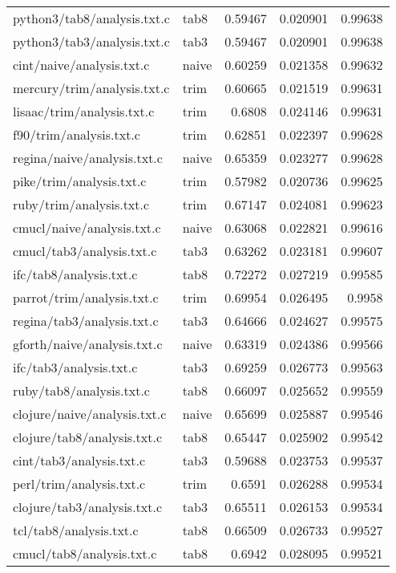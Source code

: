 \begin{longtable}{l l r r r}
{python3/tab8/analysis.txt.c} & tab8 & 0.59467 & 0.020901 & 0.99638 \\
{python3/tab3/analysis.txt.c} & tab3 & 0.59467 & 0.020901 & 0.99638 \\
{cint/naive/analysis.txt.c} & naive & 0.60259 & 0.021358 & 0.99632 \\
{mercury/trim/analysis.txt.c} & trim & 0.60665 & 0.021519 & 0.99631 \\
{lisaac/trim/analysis.txt.c} & trim & 0.6808 & 0.024146 & 0.99631 \\
{f90/trim/analysis.txt.c} & trim & 0.62851 & 0.022397 & 0.99628 \\
{regina/naive/analysis.txt.c} & naive & 0.65359 & 0.023277 & 0.99628 \\
{pike/trim/analysis.txt.c} & trim & 0.57982 & 0.020736 & 0.99625 \\
{ruby/trim/analysis.txt.c} & trim & 0.67147 & 0.024081 & 0.99623 \\
{cmucl/naive/analysis.txt.c} & naive & 0.63068 & 0.022821 & 0.99616 \\
{cmucl/tab3/analysis.txt.c} & tab3 & 0.63262 & 0.023181 & 0.99607 \\
{ifc/tab8/analysis.txt.c} & tab8 & 0.72272 & 0.027219 & 0.99585 \\
{parrot/trim/analysis.txt.c} & trim & 0.69954 & 0.026495 & 0.9958 \\
{regina/tab3/analysis.txt.c} & tab3 & 0.64666 & 0.024627 & 0.99575 \\
{gforth/naive/analysis.txt.c} & naive & 0.63319 & 0.024386 & 0.99566 \\
{ifc/tab3/analysis.txt.c} & tab3 & 0.69259 & 0.026773 & 0.99563 \\
{ruby/tab8/analysis.txt.c} & tab8 & 0.66097 & 0.025652 & 0.99559 \\
{clojure/naive/analysis.txt.c} & naive & 0.65699 & 0.025887 & 0.99546 \\
{clojure/tab8/analysis.txt.c} & tab8 & 0.65447 & 0.025902 & 0.99542 \\
{cint/tab3/analysis.txt.c} & tab3 & 0.59688 & 0.023753 & 0.99537 \\
{perl/trim/analysis.txt.c} & trim & 0.6591 & 0.026288 & 0.99534 \\
{clojure/tab3/analysis.txt.c} & tab3 & 0.65511 & 0.026153 & 0.99534 \\
{tcl/tab8/analysis.txt.c} & tab8 & 0.66509 & 0.026733 & 0.99527 \\
{cmucl/tab8/analysis.txt.c} & tab8 & 0.6942 & 0.028095 & 0.99521 \\

\end{longtable}
